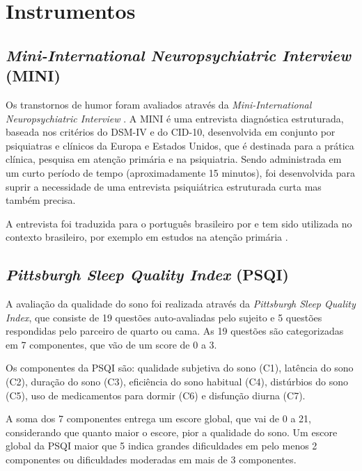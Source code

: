 \documentclass[chapter=TITLE,oneside,12pt,a4paper,english,brazil]{abntex2} %
\begin{document}
\section{Instrumentos}\label{sec:instrumentos}

    \subsection{\textit{Mini-International Neuropsychiatric Interview} (MINI)}\label{sec:mini}

        Os transtornos de humor foram avaliados através da
        \textit{Mini-International Neuropsychiatric Interview}
        \parencite{sheehan_mini-international_1998}.
        A MINI é uma entrevista diagnóstica estruturada,
        baseada nos critérios do DSM-IV e do CID-10,
        desenvolvida em conjunto por psiquiatras e clínicos da Europa e Estados Unidos,
        que é destinada para a prática clínica, pesquisa em atenção primária
        e na psiquiatria.
        Sendo administrada em um curto período de tempo (aproximadamente 15 minutos),
        foi desenvolvida para suprir a necessidade de uma entrevista psiquiátrica
        estruturada curta mas também precisa.

        A entrevista foi traduzida para o português brasileiro por
        \textcite{amorim_mini_2000} e tem sido utilizada no contexto
        brasileiro, por exemplo em estudos na atenção primária
        \parencite{de_azevedo_marques_validity_2008}.

    \subsection{\textit{Pittsburgh Sleep Quality Index} (PSQI)}\label{sec:psqi}

        A avaliação da qualidade do sono foi realizada através da
        \textit{Pittsburgh Sleep Quality Index}, que consiste de 19 questões
        auto-avaliadas pelo sujeito e 5 questões respondidas pelo parceiro de
        quarto ou cama. 
        As 19 questões são categorizadas em 7 componentes, que vão de um score
        de 0 a 3.
        \parencite{bertolazi_validation_2011}

        Os componentes da PSQI são: qualidade subjetiva do sono (C1),
        latência do sono (C2), duração do sono (C3),
        eficiência do sono habitual (C4), distúrbios do sono (C5),
        uso de medicamentos para dormir (C6) e disfunção diurna (C7).

        A soma dos 7 componentes entrega um escore global, que vai de 0 a 21,
        considerando que quanto maior o escore, pior a qualidade do sono.
        Um escore global da PSQI maior que 5 indica grandes dificuldades
        em pelo menos 2 componentes ou dificuldades moderadas em mais de 3 componentes.
\end{document}
